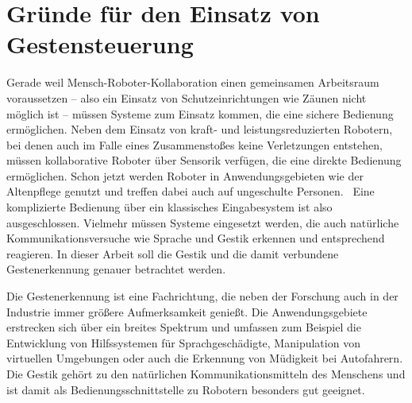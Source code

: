 \section{Gründe für den Einsatz von Gestensteuerung}
Gerade weil Mensch-Roboter-Kollaboration einen gemeinsamen Arbeitsraum voraussetzen -- also ein Einsatz von Schutzeinrichtungen wie Zäunen nicht möglich ist -- müssen Systeme zum Einsatz kommen, die eine sichere Bedienung ermöglichen. Neben dem Einsatz von kraft- und leistungsreduzierten Robotern, bei denen auch im Falle eines Zusammenstoßes keine Verletzungen entstehen, müssen kollaborative Roboter über Sensorik verfügen, die eine direkte Bedienung ermöglichen. Schon jetzt werden Roboter in Anwendungsgebieten wie der Altenpflege genutzt und treffen dabei auch auf ungeschulte Personen.~\cite{fraunhoferMRK} Eine komplizierte Bedienung über ein klassisches Eingabesystem ist also ausgeschlossen. Vielmehr müssen Systeme eingesetzt werden, die auch natürliche Kommunikationsversuche wie Sprache und Gestik erkennen und entsprechend reagieren. In dieser Arbeit soll die Gestik und die damit verbundene Gestenerkennung genauer betrachtet werden.

Die Gestenerkennung ist eine Fachrichtung, die neben der Forschung auch in der Industrie immer größere Aufmerksamkeit genießt. Die Anwendungsgebiete erstrecken sich über ein breites Spektrum und umfassen zum Beispiel die Entwicklung von Hilfssystemen für Sprachgeschädigte,  Manipulation von virtuellen Umgebungen oder auch die Erkennung von Müdigkeit bei Autofahrern. Die Gestik gehört zu den natürlichen Kommunikationsmitteln des Menschens und ist damit als Bedienungsschnittstelle zu Robotern besonders gut geeignet.